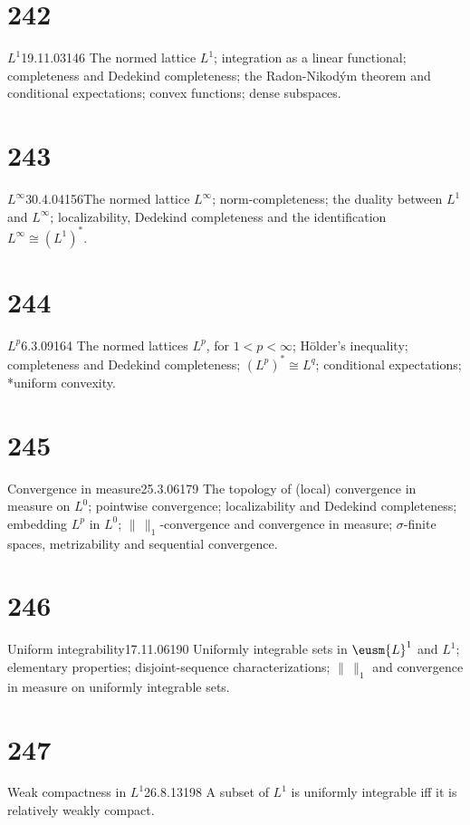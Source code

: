 \section{242}{$L^1$}{19.11.03}{146}{}
{The normed lattice $L^1$;  integration as a linear functional;
completeness and Dedekind completeness;  the Radon-Nikod\'ym theorem and
conditional expectations;  convex functions;  dense subspaces.}

\section{243}{$L^{\infty}$}{30.4.04}{156}{}{The normed lattice
$L^{\infty}$;  norm-completeness;  the duality
between $L^1$ and $L^{\infty}$;  localizability, Dedekind completeness
and the identification $L^{\infty}\cong(L^1)^*$.}

\section{244}{$L^p$}{6.3.09}{164}{}
{The normed lattices $L^p$, for $1<p<\infty$;  H\"older's
inequality;  completeness and Dedekind completeness;
$(L^p)^*\cong{L^q}$;  conditional expectations;  *uniform convexity.}

\section{245}{Convergence in measure}{25.3.06}{179}{}
{The topology of (local) convergence in measure on $L^0$;
pointwise convergence;  localizability and Dedekind completeness;
embedding $L^p$ in $L^0$;  $\|\,\|_1$-\vthsp{}convergence and
convergence in
measure;  $\sigma$-finite spaces, metrizability and sequential
convergence.}

\section{246}{Uniform integrability}{17.11.06}{190}{}
{Uniformly integrable sets in $\eusm{L}^1$ and $L^1$;  elementary
properties;  disjoint-sequence characterizations;  $\|\,\|_1$ and
convergence in measure on uniformly integrable sets.}

\section{247}{Weak compactness in $L^1$}{26.8.13}{198}{}
{A subset of $L^1$ is uniformly integrable iff it is relatively weakly
compact.}

